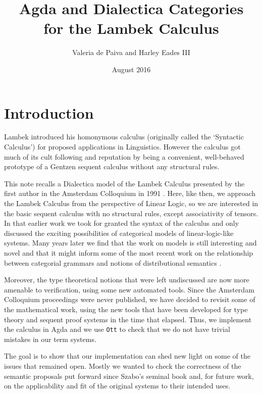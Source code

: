 \documentclass{article}
\title{Agda and Dialectica Categories \\for the Lambek Calculus}
\author{Valeria de Paiva and Harley Eades III}
\date{August 2016}
\begin{document}
\maketitle

\section*{Introduction}
 Lambek  introduced his homonymous calculus (originally called the  `Syntactic Calculus') for  proposed applications in Linguistics.  
 However the calculus got much of its cult following  and reputation by being a convenient, well-behaved prototype of a Gentzen sequent calculus without any structural rules. 

This note recalls a Dialectica model of the Lambek Calculus presented
by the first author in the Amsterdam Colloquium in 1991 \cite{depaiva1991}. Here, like then, we approach
the Lambek Calculus from the perspective of Linear Logic, so we are interested in the basic  sequent calculus with no structural rules, except associativity of tensors. In that
earlier work we took for granted the syntax of the calculus and only
discussed the exciting possibilities of  categorical models of linear-logic-like systems.  Many years later we find that the work on models is still interesting and novel  and
that it might inform some of the most recent work on the relationship
between categorial grammars and notions of distributional
semantics \cite{coecke2013}.

Moreover, the type theoretical notions that were left undiscussed are now more amenable to verification, using some new automated tools. Since the Amsterdam Colloquium proceedings were never
published,
 we have
decided to revisit some of the mathematical work,  using the new tools that have been developed for type theory and sequent proof systems in
the time that elapsed. Thus, we implement the calculus in Agda \cite{bove2009} and we
use \texttt{Ott} \cite{Sewell:2010} to check that we do not have trivial
mistakes in our term systems. 

The goal is to show that  our  implementation can shed new light on some of the issues that remained
open.  Mostly we wanted to check the correctness of the semantic proposals put forward since Szabo's seminal book \cite{szabo1978} and, for future work, on the applicability and fit of the original systems to their intended uses.
\end{document}
